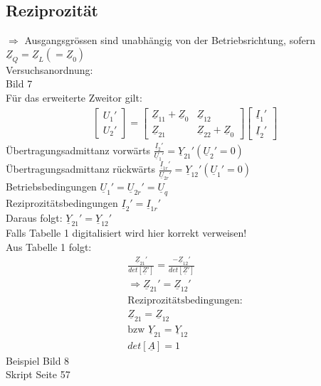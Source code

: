 \subsection{Reziprozität}
$\Rightarrow$ Ausgangsgrössen sind unabhängig von der Betriebsrichtung, sofern
$\underline{Z}_{Q}=\underline{Z}_{L} \left(=\underline{Z}_{0}\right)$\\
Versuchsanordnung:\\
Bild 7\\
Für das erweiterte Zweitor gilt:\\
\begin{align}
	\begin{bmatrix}
		U_1'\\
		U_2'
	\end{bmatrix}
	=	
	\begin{bmatrix}
		\underline{Z}_{11}+\underline{Z}_{0} & \underline{Z}_{12}\\
		\underline{Z}_{21} & \underline{Z}_{22}+\underline{Z}_0
	\end{bmatrix}
	\begin{bmatrix}
		\underline{I}_1'\\
		\underline{I}_2'
	\end{bmatrix}\nonumber
\end{align}
Übertragungsadmittanz vorwärts $\frac{\underline{I}_{2}'}{\underline{U}_{1}'}=\underline{Y}_{21}'
	(\underline{U}_{2}'=0)$\\
Übertragungsadmittanz rückwärts
$\frac{\underline{I}_{1r}'}{\underline{U}_{2r}'}=\underline{Y}_{12}'
(\underline{U}_{1}'=0)$\\
Betriebsbedingungen $\underline{U}_{1}'=\underline{U}_{2r}'=\underline{U}_{q}$\\
Reziprozitätsbedingungen $\underline{I}_{2}'=\underline{I}_{1r}'$\\
Daraus folgt: $\underline{Y}_{21}'=\underline{Y}_{12}'$\\
Falls Tabelle 1 digitalisiert wird hier korrekt verweisen!\\
Aus Tabelle 1 folgt:\\
\begin{align}
	\frac{\underline{Z}_{21}'}{det[\underline{Z}']}=\frac{-\underline{Z}_{12}'}{det[\underline{Z}']}\nonumber\\
	\Rightarrow \underline{Z}_{21}'=\underline{Z}_{12}'\nonumber\\
	\text{Reziprozitätsbedingungen:}\nonumber\\
	\boxed{\underline{Z}_{21}=\underline{Z}_{12}}\\
	\text{bzw }\boxed{\underline{Y}_{21}=\underline{Y}_{12}}\nonumber\\
	\boxed{det[\underline{A}]=1}\nonumber
\end{align}
Beispiel Bild 8\\
Skript Seite 57\\

